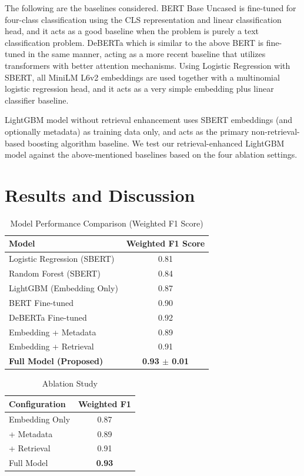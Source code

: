 \documentclass[11pt]{article}
\begin{document}
The following are the baselines considered. BERT Base Uncased is fine-tuned for four-class classification using the CLS representation and linear classification head, and it acts as a good baseline when the problem is purely a text classification problem. DeBERTa which is similar to the above BERT is fine-tuned in the same manner, acting as a more recent baseline that utilizes transformers with better attention mechanisms. Using Logistic Regression with SBERT, all MiniLM L6v2 embeddings are used together with a multinomial logistic regression head, and it acts as a very simple embedding plus linear classifier baseline.

LightGBM model without retrieval enhancement uses SBERT embeddings (and optionally metadata) as training data only, and acts as the primary non-retrieval-based boosting algorithm baseline. We test our retrieval-enhanced LightGBM model against the above-mentioned baselines based on the four ablation settings.

\section{Results and Discussion}


\begin{table}[H]
\centering
\caption{Model Performance Comparison (Weighted F1 Score)}
\begin{tabular}{lc}
\toprule
Model & Weighted F1 Score \\
\midrule
Logistic Regression (SBERT) & 0.81 \\
Random Forest (SBERT) & 0.84 \\
LightGBM (Embedding Only) & 0.87 \\
BERT Fine-tuned & 0.90 \\
DeBERTa Fine-tuned & 0.92 \\
\midrule
Embedding + Metadata & 0.89 \\
Embedding + Retrieval & 0.91 \\
\textbf{Full Model (Proposed)} & \textbf{0.93 $\pm$ 0.01} \\
\bottomrule
\end{tabular}
\label{tab:results}
\end{table}

\begin{table}[H]
\centering
\caption{Ablation Study}
\begin{tabular}{lc}
\toprule
Configuration & Weighted F1 \\
\midrule
Embedding Only & 0.87 \\
+ Metadata & 0.89 \\
+ Retrieval & 0.91 \\
Full Model & \textbf{0.93} \\
\bottomrule
\end{tabular}
\label{tab:ablation}
\end{table}
\end{document}
